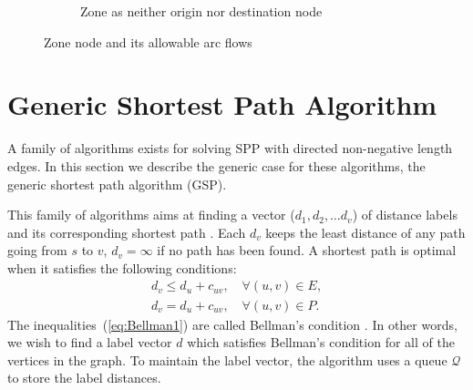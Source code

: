 \begin{figure}[H]
    \vspace{1cm}
    \begin{subfigure}[t]{\textwidth}
        \centering
        \caption{Zone as neither origin nor destination node}
    \end{subfigure}
    \caption{Zone node and its allowable arc flows}
    \label{fig:zonenodes}
\end{figure}

\begin{comment}
Through out the report,
run-time analysis (big O and other notations) is used to demonstrate the estimation of algorithm running time regarding their input size. 
\todo[inline]{How do I nicely say `let the reader refer to other resources?'
or do I describe what big O notation is?}
\end{comment}

\section{Generic Shortest Path Algorithm}
A family of algorithms exists for solving SPP with directed non-negative length edges.
In this section we describe the generic case for these
algorithms, the generic shortest path algorithm (GSP).

This family of algorithms aims at finding a 
vector ($d_1, d_2,\dots d_v$) of distance labels and its corresponding shortest path \citep{Klunder}.
Each $d_v$ keeps the least distance of any path going from $s$ to $v$, $d_v = \infty$ if no path has been found.
A shortest path is optimal when it satisfies the following conditions:
\begin{align}
    d_v \leq d_u + c_{uv}, \quad \forall(u,v) \in E, \label{eq:Bellman1}\\
    d_v  =   d_u + c_{uv}, \quad \forall(u,v) \in P.
\end{align}
The inequalities~(\ref{eq:Bellman1}) are called Bellman's condition \citep{Bellman}.
In other words,
we wish to find a label vector $d$ which satisfies Bellman's condition for all of the vertices in the graph.
To maintain the label vector, the algorithm uses a queue $\mathcal{Q}$ to store the label distances.

